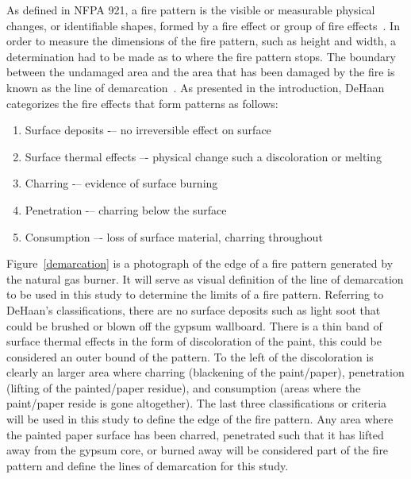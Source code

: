 \documentclass[twoside]{uocthesis}
\begin{document}
As defined in NFPA 921, a fire pattern is the visible or measurable physical changes, or identifiable shapes, formed by a fire effect or group of fire effects~\cite{NFPA:921}.  In order to measure the dimensions of the fire pattern, such as height and width, a determination had to be made as to where the fire pattern stops.  The boundary between the undamaged area and the area that has been damaged by the fire is known as the line of demarcation~\cite{NFPA:921}.  As presented in the introduction, DeHaan~\cite{DeHaan:2012} categorizes the fire effects that form patterns as follows:
\begin{enumerate}
	\item Surface deposits -– no irreversible effect on surface
	\item Surface thermal effects –- physical change such a discoloration or melting
	\item Charring -– evidence of surface burning
	\item Penetration -– charring below the surface
	\item Consumption –- loss of surface material, charring throughout
\end{enumerate}

Figure~\ref{demarcation} is a photograph of the edge of a fire pattern generated by the natural gas burner.  It will serve as visual definition of the line of demarcation to be used in this study to determine the limits of a fire pattern.  Referring to DeHaan's classifications, there are no surface deposits such as light soot that could be brushed or blown off the gypsum wallboard.  There is a thin band of surface thermal effects in the form of discoloration of the paint, this could be considered an outer bound of the pattern. To the left of the discoloration is clearly an larger area where charring (blackening of the paint/paper), penetration (lifting of the painted/paper residue), and consumption (areas where the paint/paper reside is gone altogether).  The last three classifications or criteria will be used in this study to define the edge of the fire pattern.  Any area where the painted paper surface has been charred, penetrated such that it has lifted away from the gypsum core, or burned away will be considered part of the fire pattern and define the lines of demarcation for this study.
\end{document}
